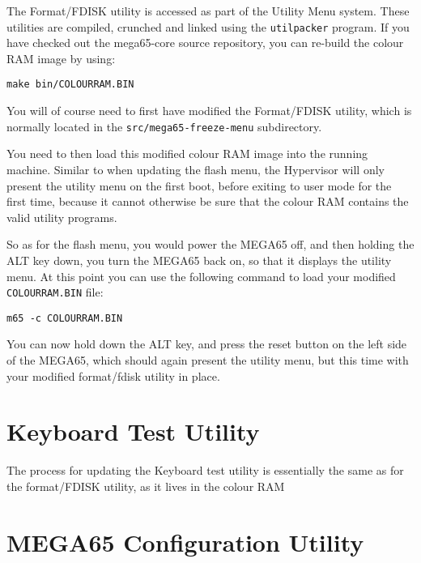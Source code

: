 The Format/FDISK utility is accessed as part of the Utility Menu system.  These utilities are compiled, crunched and linked using the
{\tt utilpacker} program.  If you have checked out the mega65-core source repository, you can re-build the colour RAM image by using:

\begin{tcolorbox}[colback=black,coltext=white]
\verbatimfont{\codefont}
\begin{verbatim}
make bin/COLOURRAM.BIN
\end{verbatim}
\end{tcolorbox}

You will of course need to first have modified the Format/FDISK utility, which is normally located in the {\tt src/mega65-freeze-menu} subdirectory.

You need to then load this modified colour RAM image into the running machine. Similar to when updating the flash menu, the Hypervisor will
only present the utility menu on the first boot, before exiting to user mode for the first time, because it cannot otherwise be sure that
the colour RAM contains the valid utility programs.  

So as for the flash menu, you would power the MEGA65 off, and then holding the ALT key down, you turn the MEGA65 back on, so that it displays the utility menu.  At this point you can use the following command to load your modified {\tt COLOURRAM.BIN} file:

\begin{tcolorbox}[colback=black,coltext=white]
\verbatimfont{\codefont}
\begin{verbatim}
m65 -c COLOURRAM.BIN
\end{verbatim}
\end{tcolorbox}

You can now hold down the ALT key, and press the reset button on the left side of the MEGA65, which should again present the utility menu,
but this time with your modified format/fdisk utility in place.

\section{Keyboard Test Utility}

The process for updating the Keyboard test utility is essentially the same as for the format/FDISK utility, as it lives in the colour RAM

\section{MEGA65 Configuration Utility}

